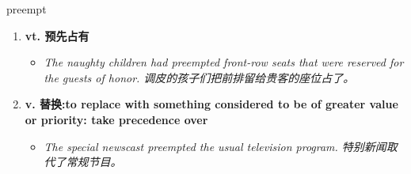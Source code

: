 
\begin{frame}
{\huge preempt}
\begin{center}
\begin{enumerate}\Large
  \item \textbf{vt. 预先占有}
  \begin{itemize}
    \item \em{\Large{The naughty children had preempted front-row seats that were reserved for the guests of honor. 调皮的孩子们把前排留给贵客的座位占了。}}
  \end{itemize}
  \item \textbf{v. 替换:to replace with something considered to be of greater value or priority: take precedence over}
  \begin{itemize}
    \item \em{\Large{The special newscast preempted the usual television program. 特别新闻取代了常规节目。}}
  \end{itemize}
\end{enumerate}
\end{center}
\end{frame}

